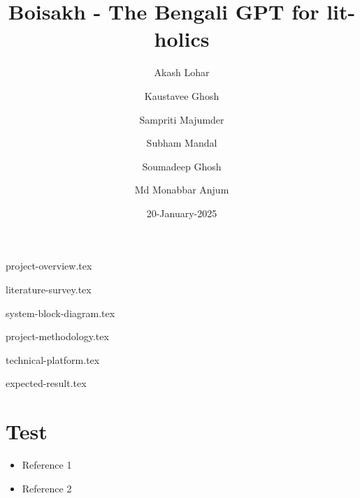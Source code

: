 \documentclass[12pt, a4paper]{article}
\title{Boisakh - The Bengali GPT for lit-holics}
\author{
    Akash Lohar \and
    Kaustavee Ghosh \and
    Sampriti Majumder \and
    Subham Mandal \and
    Soumadeep Ghosh \and
    Md Monabbar Anjum
}
\date{20-January-2025}
\begin{document}
\maketitle
\pagebreak
{}

\doublespace %
\tableofcontents
\singlespace %
\begin{appendix}
    \listoffigures
    \listoftables
\end{appendix}
\pagebreak

{project-overview.tex}

{literature-survey.tex}

{system-block-diagram.tex}

{project-methodology.tex}

{technical-platform.tex}

{expected-result.tex}

\section{Test}
\begin{itemize}
    \item Reference 1
    \item Reference 2
\end{itemize}

\newpage
{}


\end{document}

